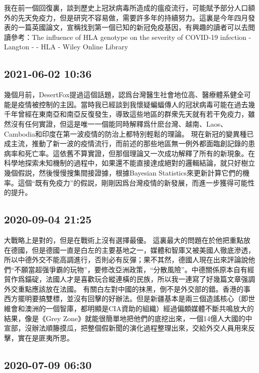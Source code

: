 \documentclass[twocolumn]{ctexart}
\begin{document}
我在前一個回復裏，談到歷史上冠狀病毒所造成的瘟疫流行，可能賦予部分人口額外的先天免疫力，但是研究不容易做，需要許多年的持續努力。這裏是今年四月發表的一篇英國論文，宣稱找到第一個已知的新冠免疫基因，有興趣的讀者可以去閲讀參考：The influence of HLA genotype on the severity of COVID‐19 infection - Langton - - HLA - Wiley Online Library
\subsection*{2021-06-02 10:36}

幾個月前，DesertFox提過這個話題，認爲台灣醫生社會地位高、醫療體系健全可能是疫情被控制的主因。當時我已經談到我懷疑蝙蝠傳人的冠狀病毒可能在過去幾千年曾經在東南亞和南亞反復發生，導致這些地區的群衆先天就有若干免疫力，雖然沒有任何實證，但這是唯一一個能同時解釋爲什麽台灣、越南、Laos、Cambodia和印度在第一波疫情的防治上都特別輕鬆的理論。
現在新冠的變異種已成主流，推動了新一波的疫情流行，而前述的那些地區無一例外都面臨創記錄的患病率和死亡率。這依舊不算實證，但那個理論又一次成功解釋了所有的新現象。在科學地探索未知機制的過程中，如果還不能直接達成絕對的邏輯結論，就只好樹立幾個假説，然後慢慢搜集間接證據，根據Bayesian Statistics來更新計算它們的機率。這個“既有免疫力”的假説，剛剛因爲台灣疫情的新發展，而進一步獲得可能性的提升。
\subsection*{2020-09-04 21:25}

大戰略上是對的，但是在戰術上沒有選擇最優。
這裏最大的問題在於他把重點放在德國，但是德國一直是白左的主要基地之一，媒體和智庫又被美國人徹底滲透，所以中德外交不能高調進行，否則必有反彈；果不其然，德國人現在出來評論說他們“不願當超强爭霸的玩物”，要修改亞洲政策，“分散風險”。中德關係原本自有經貿作爲錨碇，法國人才是喜歡玩合縱連橫的民族，所以我一連寫了好幾篇文章强調外交重點應該放在法國。
有關白左對中國的抹黑，倒不是外交部的錯。香港的事西方擺明要搞雙標，並沒有回擊的好辦法。但是新疆基本是兩三個造謠核心（即世維會和澳洲的一個智庫，都明顯是CIA資助的組織）經過偏頗媒體不斷共鳴放大的結果，像是《Grey Zone》就能很簡單地把他們的底挖出來，一個14億人大國的中宣部，沒辦法順籐摸瓜，把整個假新聞的演化過程整理出來，交給外交人員用來反擊，實在是匪夷所思。
\subsection*{2020-07-09 06:30}
\end{document}
